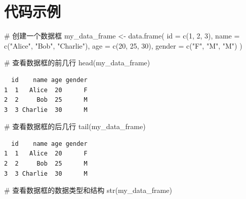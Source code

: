 \documentclass[
  letterpaper,
  DIV=11,
  numbers=noendperiod]{scrreprt}
\newenvironment{Shaded}{\begin{snugshade}}{\end{snugshade}}
\newcommand{\AttributeTok}[1]{\textcolor[rgb]{0.40,0.45,0.13}{#1}}
\newcommand{\CommentTok}[1]{\textcolor[rgb]{0.37,0.37,0.37}{#1}}
\newcommand{\DecValTok}[1]{\textcolor[rgb]{0.68,0.00,0.00}{#1}}
\newcommand{\FunctionTok}[1]{\textcolor[rgb]{0.28,0.35,0.67}{#1}}
\newcommand{\NormalTok}[1]{\textcolor[rgb]{0.00,0.23,0.31}{#1}}
\newcommand{\OtherTok}[1]{\textcolor[rgb]{0.00,0.23,0.31}{#1}}
\newcommand{\StringTok}[1]{\textcolor[rgb]{0.13,0.47,0.30}{#1}}
\begin{document}
\hypertarget{ux4ee3ux7801ux793aux4f8b}{%
\section{代码示例}\label{ux4ee3ux7801ux793aux4f8b}}

\begin{Shaded}
\begin{Highlighting}[]
\CommentTok{\# 创建一个数据框}
\NormalTok{my\_data\_frame }\OtherTok{\textless{}{-}} \FunctionTok{data.frame}\NormalTok{(}
  \AttributeTok{id =} \FunctionTok{c}\NormalTok{(}\DecValTok{1}\NormalTok{, }\DecValTok{2}\NormalTok{, }\DecValTok{3}\NormalTok{),}
  \AttributeTok{name =} \FunctionTok{c}\NormalTok{(}\StringTok{"Alice"}\NormalTok{, }\StringTok{"Bob"}\NormalTok{, }\StringTok{"Charlie"}\NormalTok{),}
  \AttributeTok{age =} \FunctionTok{c}\NormalTok{(}\DecValTok{20}\NormalTok{, }\DecValTok{25}\NormalTok{, }\DecValTok{30}\NormalTok{),}
  \AttributeTok{gender =} \FunctionTok{c}\NormalTok{(}\StringTok{"F"}\NormalTok{, }\StringTok{"M"}\NormalTok{, }\StringTok{"M"}\NormalTok{)}
\NormalTok{)}

\CommentTok{\# 查看数据框的前几行}
\FunctionTok{head}\NormalTok{(my\_data\_frame)}
\end{Highlighting}
\end{Shaded}

\begin{verbatim}
  id    name age gender
1  1   Alice  20      F
2  2     Bob  25      M
3  3 Charlie  30      M
\end{verbatim}

\begin{Shaded}
\begin{Highlighting}[]
\CommentTok{\# 查看数据框的后几行}
\FunctionTok{tail}\NormalTok{(my\_data\_frame)}
\end{Highlighting}
\end{Shaded}

\begin{verbatim}
  id    name age gender
1  1   Alice  20      F
2  2     Bob  25      M
3  3 Charlie  30      M
\end{verbatim}

\begin{Shaded}
\begin{Highlighting}[]
\CommentTok{\# 查看数据框的数据类型和结构}
\FunctionTok{str}\NormalTok{(my\_data\_frame)}
\end{Highlighting}
\end{Shaded}
\end{document}
